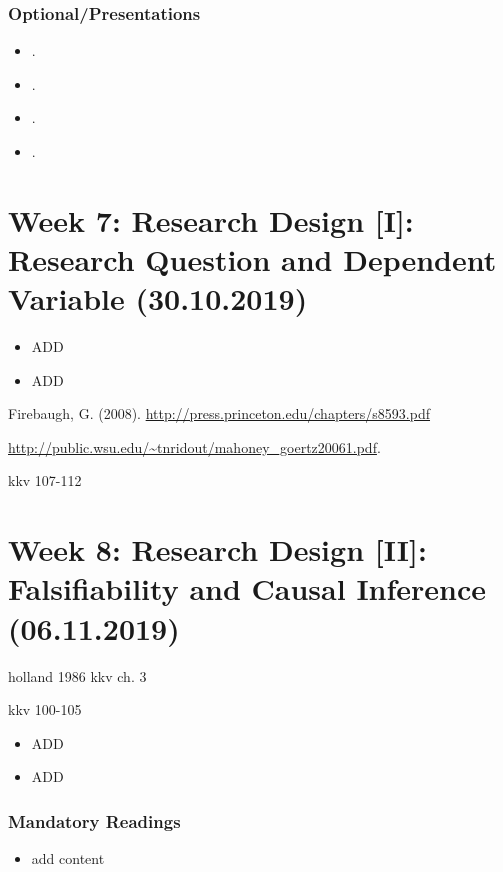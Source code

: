 \documentclass[abstract=on,parskip=full,headings=standardclasses,fontsize=11pt,paper=a4]{scrartcl}
\begin{document}
\subsubsection*{Optional/Presentations}
\begin{itemize}
\item {}.
\item {}.
\item {}.
\item {}.
\end{itemize}

 
\section{Week 7:  Research Design [I]: Research Question and Dependent Variable  (30.10.2019)}

\begin{itemize}
\renewcommand\labelitemi{--}
\item ADD
\item ADD
\end{itemize}

Firebaugh, G. (2008). \url{http://press.princeton.edu/chapters/s8593.pdf}

\url{http://public.wsu.edu/~tnridout/mahoney_goertz20061.pdf}.

kkv 107-112

\section{Week 8: Research Design [II]: Falsifiability and Causal Inference (06.11.2019)}

holland 1986
kkv ch. 3

kkv 100-105

\begin{itemize}
\renewcommand\labelitemi{--}
\item ADD
\item ADD
\end{itemize}

\subsubsection*{Mandatory Readings}
\begin{itemize}
\item add content
\end{itemize}
\end{document}
